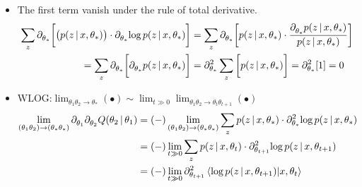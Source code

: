\begin{frame} [t]
\begin{itemize}
{\begin{align*}
    \end{align*}
    }
    \item The first term vanish 
      under the rule of total derivative.
    {\footnotesize 
    \begin{align*}
       \sum _{z}
       \del {} {\theta _{*}} {} 
       \qty \bigg [ 
       \qty \big 
           (  p \conditional 
                 {z} {x, \theta _{*}} 
           ) 
       \cdot 
       \del {} {\theta _{*}} {}
       \varlog p \conditional
               {z} {x, \theta _{*}}
        ] 
     & =
       \sum _{z}
       \del {} {\theta _{*}} {} 
       \qty \bigg [  p \conditional 
                        {z} {x, \theta _{*}}
       \cdot 
       \frac {
       \del {} {\theta _{*}} {}
          p  \conditional
              {z} {x, \theta _{*}} 
       } {
          p  \conditional 
              {z} {x, \theta _{*}} 
       }
        ] 
    \\ = 
       \sum _{z}
       \del {} {\theta _{*}} {} 
       \qty \bigg [ 
       \del {} {\theta _{*}} {}
          p \conditional 
          {z} {x, \theta _{*}}  
        ] 
    & = 
       \del {} {\theta _{*}} {2} 
       \sum _{z}
       \qty \bigg [ 
          p \conditional 
          {z} {x, \theta _{*}}  
        ]  
    =  
           \del {} {\theta _{*}} {2} 
           [ 1 ]
    = 0 
    \end{align*}
    }
    \item 
    $
        \text {WLOG:}  
      \lim 
       _{ \theta _{1} \theta _{2}
          \rightarrow \theta _{*}
        } 
      ( \bullet )
      \sim 
      \lim 
       _{ t \gg 0
        }
      \lim 
       _{ \theta _{1} \theta _{2}
          \rightarrow  
          \theta _{t} \theta _{t+1}
        }
      ( \bullet )  
    $   
    {\footnotesize 
    \begin{align*} 
      \lim _{ ( \theta _{1} 
                \theta _{2} 
              )
              \rightarrow
              ( \theta _{*} 
                \theta _{*} 
              )
            } 
      \del {} {\theta _{1}} {}
      \del { Q \conditional 
               {\theta _{2}} 
               {\theta _{1}}
           } {\theta _{2}} {}
    & = (-)  
     \lim _{ ( \theta _{1} 
        \theta _{2} 
      )
      \rightarrow
      ( \theta _{*} 
        \theta _{*} 
      )
            } 
       \sum _{z}
        p \conditional 
            {z} {x, \theta _{*}}
       \cdot 
       \del {} 
             {\theta _{*}} {2}
       \varlog p \conditional 
               {z} {x, \theta _{*}}
    \\ & =
    (-) 
    \lim  _{t \gg 0} 
    \sum _{z} 
    p \conditional {z} {x,\theta _{t}}
    \cdot 
    \del 
     { \varlog p \conditional 
               {z} {x , \theta _{t+1}}
     } 
     {\theta _{t+1}} {2} 
    \\ & = 
    (-) \lim _{t \gg 0}
    \del 
     {} {\theta _{t + 1}} {2}
     \braket 
      {
        \varlog p 
        \conditional 
           {z} {x, \theta _{t+1}}
      }
      {x, \theta _{t}}
    \end{align*}     
    } 
\end{itemize}
\end{frame}


